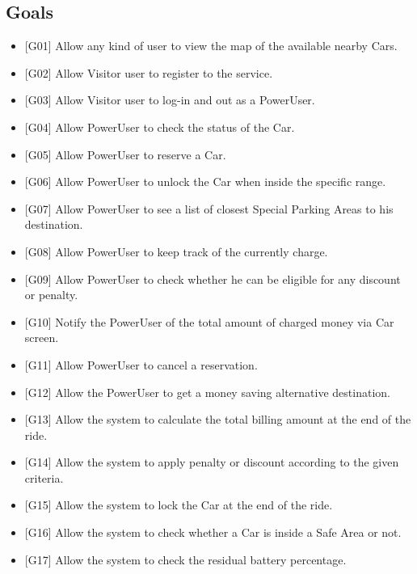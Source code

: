 \documentclass{article}
\begin{document}
\subsection{Goals}
\begin{itemize}
\item {[}G01{]} Allow any kind of user to view the map of the available nearby Cars.
\item {[}G02{]} Allow Visitor user to register to the service.
\item {[}G03{]} Allow Visitor user to log-in and out as a PowerUser.
\item {[}G04{]} Allow PowerUser to check the status of the Car.
\item {[}G05{]} Allow PowerUser to reserve a Car.
\item {[}G06{]} Allow PowerUser to unlock the Car when inside the specific range.
\item {[}G07{]} Allow PowerUser to see a list of closest Special Parking Areas to his destination.
\item {[}G08{]} Allow PowerUser to keep track of the currently charge. 
\item {[}G09{]} Allow PowerUser to check whether he can be eligible for any discount or penalty.
\item {[}G10{]} Notify the PowerUser of the total amount of charged money via Car screen.
\item {[}G11{]} Allow PowerUser to cancel a reservation.
\item {[}G12{]} Allow the PowerUser to get a money saving alternative destination.
\item {[}G13{]} Allow the system to calculate the total billing amount at the end of the ride.
\item {[}G14{]} Allow the system to apply penalty or discount according to the given criteria.
\item {[}G15{]} Allow the system to lock the Car at the end of the ride.
\item {[}G16{]} Allow the system to check whether a Car is inside a Safe Area or not.
\item {[}G17{]} Allow the system to check the residual battery percentage.
\end{itemize}
\end{document}
